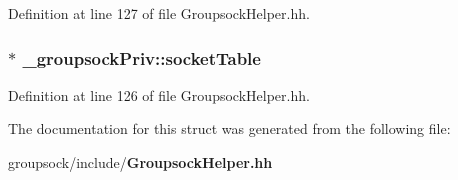 Definition at line 127 of file Groupsock\+Helper.\+hh.

\subsubsection[{socket\+Table}]{$\ast$ \+\_\+groupsock\+Priv\+::socket\+Table}\label{struct__groupsockPriv_abe1f8be88b68fa3cf33a23dfb1d72861}


Definition at line 126 of file Groupsock\+Helper.\+hh.



The documentation for this struct was generated from the following file\+:\begin{DoxyCompactItemize}
\item 
groupsock/include/{\bf Groupsock\+Helper.\+hh}\end{DoxyCompactItemize}
